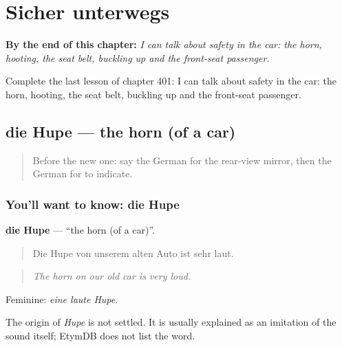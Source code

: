 
\chapter{Sicher unterwegs}
\label{ch:ge-sicher-unterwegs}

\begin{chapteropening}
\textbf{By the end of this chapter:} \emph{I can talk about safety in the car: the horn, hooting, the seat belt, buckling up and the front-seat passenger.}

Complete the last lesson of chapter 401: I can talk about safety in the car: the horn, hooting, the seat belt, buckling up and the front-seat passenger.
\end{chapteropening}

\section[die Hupe]{die Hupe — the horn (of a car)}

\label{lesson:GE-C401-hupe}



\begin{quote}
Before the new one: say the German for the rear-view mirror, then the German for to indicate.
\end{quote}

\subsection*{You'll want to know: die Hupe}
\textbf{die Hupe} — \textquotedblleft{}the horn (of a car)\textquotedblright{}.

\begin{quote}
Die Hupe von unserem alten Auto ist sehr laut.
\end{quote}

\begin{quote}
\emph{The horn on our old car is very loud.}
\end{quote}

Feminine: \emph{eine laute Hupe}.

\begin{cousinweb}
The origin of \emph{Hupe} is not settled. It is usually explained as an imitation of the sound itself; EtymDB does not list the word.
\end{cousinweb}

